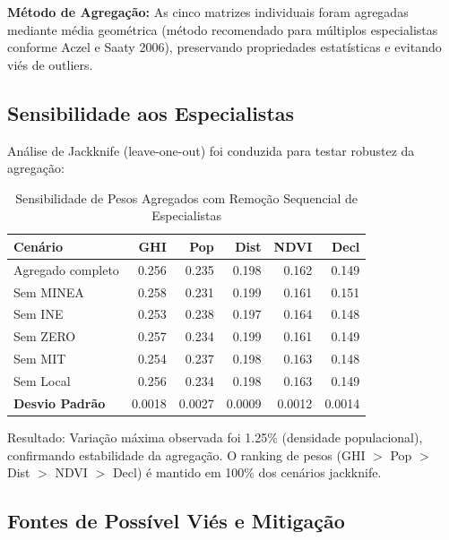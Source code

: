 \documentclass[12pt, a4paper]{article}
\begin{document}
\textbf{Método de Agregação:} As cinco matrizes individuais foram agregadas mediante média geométrica (método recomendado para múltiplos especialistas conforme Aczel e Saaty 2006), preservando propriedades estatísticas e evitando viés de outliers.

\subsection{Sensibilidade aos Especialistas}

Análise de Jackknife (leave-one-out) foi conduzida para testar robustez da agregação:

\begin{table}[H]
\centering
\small
\caption{Sensibilidade de Pesos Agregados com Remoção Sequencial de Especialistas}
\label{tab:jackknife}
\begin{tabular}{|l|r|r|r|r|r|}
\hline
\textbf{Cenário} & \textbf{GHI} & \textbf{Pop} & \textbf{Dist} & \textbf{NDVI} & \textbf{Decl} \\
\hline
Agregado completo & 0.256 & 0.235 & 0.198 & 0.162 & 0.149 \\
Sem MINEA & 0.258 & 0.231 & 0.199 & 0.161 & 0.151 \\
Sem INE & 0.253 & 0.238 & 0.197 & 0.164 & 0.148 \\
Sem ZERO & 0.257 & 0.234 & 0.199 & 0.161 & 0.149 \\
Sem MIT & 0.254 & 0.237 & 0.198 & 0.163 & 0.148 \\
Sem Local & 0.256 & 0.234 & 0.198 & 0.163 & 0.149 \\
\hline
\textbf{Desvio Padrão} & 0.0018 & 0.0027 & 0.0009 & 0.0012 & 0.0014 \\
\hline
\end{tabular}
\end{table}

Resultado: Variação máxima observada foi 1.25\% (densidade populacional), confirmando estabilidade da agregação. O ranking de pesos (GHI $>$ Pop $>$ Dist $>$ NDVI $>$ Decl) é mantido em 100\% dos cenários jackknife.

\subsection{Fontes de Possível Viés e Mitigação}
\end{document}
